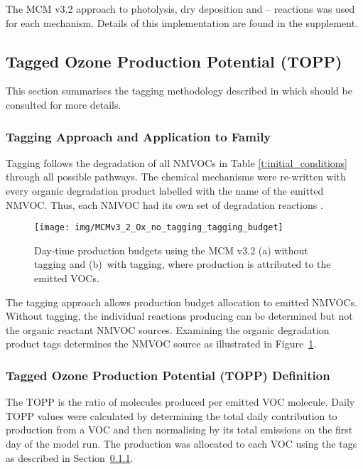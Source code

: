 The MCM v3.2 approach to photolysis, dry deposition and -- reactions was used for each mechanism. 
Details of this implementation are found in the supplement.

\subsection{Tagged Ozone Production Potential (TOPP)}
This section summarises the tagging methodology described in \citet{Butler:2011} which should be consulted for more details.

\subsubsection[Tagging Approach and Application to Ox Family]{Tagging Approach and Application to  Family} \label{ss:tagging} %

Tagging follows the degradation of all NMVOCs in Table \ref{t:initial_conditions} through all possible pathways. 
The chemical mechanisms were re-written with every organic degradation product labelled with the name of the emitted NMVOC. 
Thus, each NMVOC had its own set of degradation reactions \citep{Butler:2011}. 

\begin{figure}
    \centering
    \texttt{[image: img/MCMv3\_2\_Ox\_no\_tagging\_tagging\_budget]}
    \vspace{0mm}
    \caption{Day-time  production budgets using the MCM v3.2 (a) without tagging and \mbox{(b) with} tagging, where  production is attributed to the emitted VOCs.}
    \vspace{-4mm}
    \label{f:Ox_budget}
\end{figure} 

The tagging approach allows production budget allocation to emitted NMVOCs. 
Without tagging, the individual reactions producing  can be determined but not the organic reactant NMVOC sources. 
Examining the organic degradation product tags determines the NMVOC source as illustrated in \mbox{Figure \ref{f:Ox_budget}}.

\subsubsection{Tagged Ozone Production Potential (TOPP) Definition} %

The TOPP is the ratio of  molecules produced per emitted VOC molecule.  
Daily TOPP values were calculated by determining the total daily contribution to  production from a VOC and then normalising by its total emissions on the first day of the model run. 
The  production was allocated to each VOC using the tags as described in \mbox{Section \ref{ss:tagging}}. 
